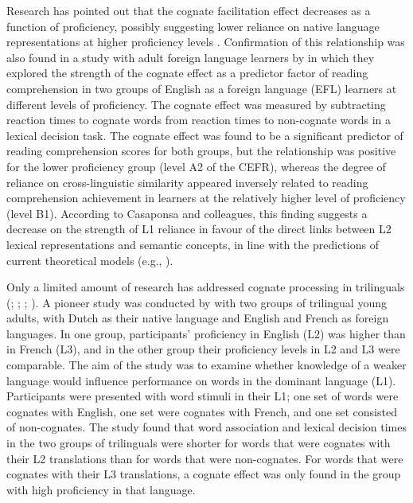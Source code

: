 \documentclass[output=paper,modfonts,nonflat,newtxmath]{langsci/langscibook}
\begin{document}
 {Research has pointed out that the cognate facilitation effect decreases as a function of proficiency, possibly suggesting lower reliance on native language representations at higher proficiency levels \citep{KrollEtAl2010}. Confirmation of this relationship was also found in a study with adult foreign language learners by \citet{CasaponsaEtAl2015} in which they explored the strength of the cognate effect as a predictor factor of reading comprehension in two groups of English as a foreign language (EFL) learners at different levels of proficiency. The cognate effect was measured by subtracting reaction times to cognate words from reaction times to non-cognate words in a lexical decision task. The cognate effect was found to be a significant predictor of reading comprehension scores for both groups, but the relationship was positive for the lower proficiency group (level A2 of the CEFR), whereas the degree of reliance on cross-linguistic similarity appeared inversely related to reading comprehension achievement in learners at the relatively higher level of proficiency (level B1). According to Casaponsa and colleagues, this finding suggests a decrease on the strength of L1 reliance in favour of the direct links between L2 lexical representations and semantic concepts, in line with the predictions of current theoretical models (e.g., \citealt{KrollStewart1994}).}

 {Only a limited amount of research has addressed cognate processing in trilinguals (\citealt{VanHellDijkstra2002}; \citealt{LemhoferEtAl2004}; \citealt{Szubko-Sitarek2011}; \citealt{PoarchvanHell2012}). A pioneer study was conducted by \citet{VanHellDijkstra2002} with two groups of trilingual young adults, with Dutch as their native language and English and French as foreign languages. In one group, participants’ proficiency in English (L2) was higher than in French (L3), and in the other group their proficiency levels in L2 and L3 were comparable. The aim of the study was to examine whether knowledge of a weaker language would influence performance on words in the dominant language (L1). Participants were presented with word stimuli in their L1; one set of words were cognates with English, one set were cognates with French, and one set consisted of non-cognates. The study found that word association and lexical decision times in the two groups of trilinguals were shorter for words that were cognates with their L2 translations than for words that were non-cognates. For words that were cognates with their L3 translations, a cognate effect was only found in the group with high proficiency in that language.}
\end{document}
